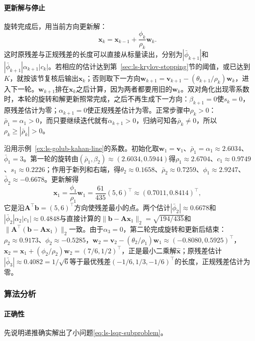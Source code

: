 \paragraph{更新解与停止}
旋转完成后，用当前方向更新解：
\[
 \bm x_k=\bm x_{k-1}+\frac{\phi_k}{\rho_k}\bm w_k .
\]
这时原残差与正规残差的长度可以直接从标量读出，分别为$|\bar\phi_{k+1}|$和$|\bar\phi_{k+1}|\alpha_{k+1}|c_k|$。若相应的估计达到第~\ref{sec:ls-krylov-stopping}节的阈值，或已达到$K$，就按该节复核后输出$\bm x_k$；否则取下一方向$\bm w_{k+1}=\bm v_{k+1}-(\theta_{k+1}/\rho_k)\bm w_k$，进入下一轮。$\bm w_{k+1}$排在$\bm x_k$之后计算，因为两者都要用旧的$\bm w_k$。双对角化出现零系数时，本轮的旋转和解更新照常完成，之后不再生成下一方向：$\beta_{k+1}=0$使$s_k=0$，原残差估计为零；$\alpha_{k+1}=0$使正规残差估计为零。正常步骤中$\rho_k>0$：$\bar\rho_1=\alpha_1>0$，而只要继续迭代就有$\alpha_{k+1}>0$，归纳可知各$\bar\rho_k\ne0$，所以$\rho_k\ge|\bar\rho_k|>0$。

\begin{example}[直线拟合上的LSQR]
\label{ex:ls-lsqr-line}
沿用示例~\ref{ex:ls-golub-kahan-line}的系数。初始化取$\bm w_1=\bm v_1$、$\bar\rho_1=\alpha_1\approx2.6034$、$\bar\phi_1=3$。第一轮的旋转由$(\bar\rho_1,\beta_2)\approx(2.6034,0.5944)$得$\rho_1\approx2.6704$、$c_1\approx0.9749$、$s_1\approx0.2226$；作用于新列和右端，得$\theta_2\approx0.1658$、$\bar\rho_2\approx0.7259$、$\phi_1\approx2.9247$、$\bar\phi_2\approx-0.6678$。更新解得
\[
 \bm x_1=\frac{\phi_1}{\rho_1}\bm w_1=\frac{61}{435}(5,6)^\top\approx(0.7011,0.8414)^\top ,
\]
它是沿$\bm A^\top\bm b=(5,6)^\top$方向使残差最小的点。两个估计$|\bar\phi_2|\approx0.6678$和$|\bar\phi_2|\alpha_2|c_1|\approx0.4848$与直接计算的$\lVert\bm b-\bm A\bm x_1\rVert_2=\sqrt{194/435}$和$\lVert\bm A^\top(\bm b-\bm A\bm x_1)\rVert_2$一致。由于$\alpha_3=0$，第二轮完成旋转和更新后结束：$\rho_2\approx0.9173$、$\phi_2\approx-0.5285$，$\bm w_2=\bm v_2-(\theta_2/\rho_1)\bm w_1\approx(-0.8080,0.5925)^\top$，$\bm x_2=\bm x_1+(\phi_2/\rho_2)\bm w_2=(7/6,1/2)^\top$，正是最小二乘解$\hat{\bm x}$；原残差估计$|\bar\phi_3|\approx0.4082=1/\sqrt6$等于最优残差$(-1/6,1/3,-1/6)^\top$的长度，正规残差估计为零。
\end{example}

\subsubsection{算法分析}

\paragraph{正确性}
先说明递推确实解出了小问题\eqref{eq:ls-lsqr-subproblem}。

